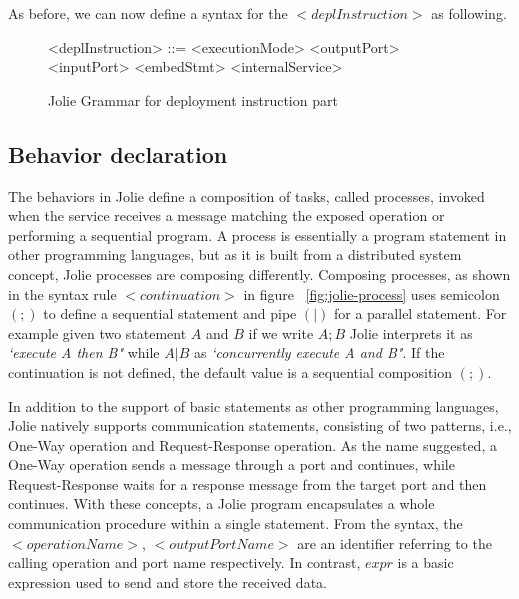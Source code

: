 






As before, we can now define a syntax for the \(<deplInstruction>\) as following.

\begin{figure}[h]
    \begin{framed}
        \begin{grammar}
            <deplInstruction> ::= <executionMode>
            \alt <outputPort>
            \alt <inputPort>
            \alt <embedStmt>
            \alt <internalService>
        \end{grammar}
    \end{framed}
    \caption{Jolie Grammar for deployment instruction part}
    \label{fig:jolie-depl}
\end{figure}


\subsection{Behavior declaration}
\label{sec:jolie-behavior}

The behaviors in Jolie define a composition of tasks, called processes, invoked when the service receives a message matching the exposed operation or performing a sequential program. A process is essentially a program statement in other programming languages, but as it is built from a distributed system concept, Jolie processes are composing differently. Composing processes, as shown in the syntax rule \(<continuation>\) in figure ~\ref{fig:jolie-process}  uses semicolon \((;)\) to define a sequential statement and pipe \((|)\) for a parallel statement. For example given two statement \(A\) and \(B\) if we write \(A ; B\) Jolie interprets it as \textit{`execute A then B"} while \(A | B\) as \textit{`concurrently execute A and B"}. If the continuation is not defined, the default value is a sequential composition \((;)\).

In addition to the support of basic statements as other programming languages, Jolie natively supports communication statements, consisting of two patterns, i.e., One-Way operation and Request-Response operation. As the name suggested, a One-Way operation sends a message through a port and continues, while Request-Response waits for a response message from the target port and then continues. With these concepts, a Jolie program encapsulates a whole communication procedure within a single statement. From the syntax, the \(<operationName>\), \(<outputPortName>\) are an identifier referring to the calling operation and port name respectively. In contrast, \(expr\) is a basic expression used to send and store the received data.

